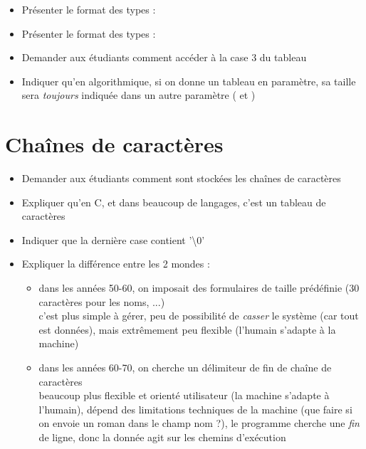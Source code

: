 \documentclass[11pt,a4paper]{article}
\begin{document}
\bigskip

\begin{itemize}
\item Présenter le format des types : 
\item Présenter le format des types : 
\item Demander aux étudiants comment accéder à la case 3 du tableau
\item Indiquer qu'en algorithmique, si on donne un tableau en paramètre, sa taille sera \textit{toujours} indiquée dans un autre paramètre ( et )
\end{itemize}

\bigskip


\section{Chaînes de caractères}

\begin{itemize}
\item Demander aux étudiants comment sont stockées les chaînes de caractères
\item Expliquer qu'en C, et dans beaucoup de langages, c'est un tableau de caractères
\item Indiquer que la dernière case contient '\textbackslash 0'
\item Expliquer la différence entre les 2 mondes :
  \begin{itemize}
  \item dans les années 50-60, on imposait des formulaires de taille prédéfinie (30 caractères pour les noms, ...)\\
        c'est plus simple à gérer, peu de possibilité de \textit{casser} le système (car tout est données), mais extrêmement peu flexible (l'humain s'adapte à la machine)
  \item dans les années 60-70, on cherche un délimiteur de fin de chaîne de caractères\\
        beaucoup plus flexible et orienté utilisateur (la machine s'adapte à l'humain), dépend des limitations techniques de la machine (que faire si on envoie un roman dans le champ nom ?), le programme cherche une \textit{fin} de ligne, donc la donnée agit sur les chemins d'exécution
  \end{itemize}
\end{itemize}
\end{document}
